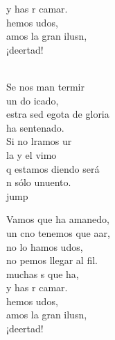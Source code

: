 \begin{cancion}
\begin{chorus}
	y has r camar.\\
	hemos udos,\\
	amos la gran ilusn, \\
	¡deertad!\\
	\end{chorus}%
	\jump\\
	Se nos man termir \\
	un do icado,\\
	estra sed egota de gloria\\
	 ha sentenado.\\
	Si no lramos ur\\
	la y el vimo\\
	q estamos diendo será\\
	n sólo unuento.\\jump\\
	\begin{chorus}%
	Vamos que  ha amanedo,\\
	un cno tenemos que aar,\\
	no lo hamos udos,\\
	no pemos llegar al fil.\\
	 muchas s que ha,\\
	y has r camar.\\
	hemos udos,\\
	amos la gran ilusn, \\
	¡deertad!\\
	\end{chorus}%
	\jump\\
\end{cancion}%

